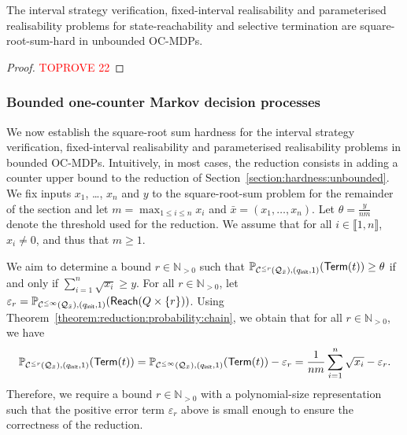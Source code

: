 \documentclass[a4paper,UKenglish,cleveref,autoref,thm-restate,colorlinks]{lipics-v2021}
\newcommand{\init}{\mathsf{init}}
\newcommand{\integerInterval}[1]{\llbracket{}#1\rrbracket{}}
\newcommand{\sqsx}{x} \newcommand{\sqsxVect}{\bar{x}} \newcommand{\sqsm}{m} \newcommand{\sqsy}{y} \newcommand{\sqsi}{i} \newcommand{\sqsn}{n} \newcommand{\sqsSize}{E}
\newcommand{\IN}{\mathbb{N}}
\newcommand{\INpos}{\IN_{>0}}
\newcommand{\ocmdp}{\mathcal{Q}}
\newcommand{\ocStateSpace}{Q}
\newcommand{\ocState}{q}
\newcommand{\ocStateC}{t}
\newcommand{\counterUB}{r}
\newcommand{\mchain}{\mathcal{C}}
\newcommand{\ocChainFin}[2]{\mchain^{\leq #2}(#1)}
\newcommand{\chainX}{\ocmdp_{\sqsxVect}}
\newcommand{\eleError}[1]{\varepsilon_{#1}}
\newcommand{\reach}[1]{\mathsf{Reach}(#1)}
\newcommand{\termination}{\mathsf{Term}}
\newcommand{\selectiveTermination}[1]{\termination({#1})}
\newcommand{\thresProba}{\theta}
\begin{document}
\begin{theorem}\label{verification:hardness:unbounded}
  The interval strategy verification, fixed-interval realisability and parameterised realisability problems for state-reachability and selective termination are square-root-sum-hard in unbounded OC-MDPs.
\end{theorem}
\begin{proof}\textcolor{red}{TOPROVE 22}\end{proof}

\subsubsection{Bounded one-counter Markov decision processes}\label{section:hardness:bounded}

We now establish the square-root sum hardness for the interval strategy verification, fixed-interval realisability and parameterised realisability problems  in bounded OC-MDPs.
Intuitively, in most cases, the reduction consists in adding a counter upper bound to the reduction of Section~\ref{section:hardness:unbounded}.
We fix inputs $\sqsx_1$, \ldots, $\sqsx_\sqsn$ and $\sqsy$ to the square-root-sum problem for the remainder of the section and let $\sqsm = \max_{1\leq\sqsi\leq\sqsn}\sqsx_\sqsi$ and $\sqsxVect = (\sqsx_1,\ldots, \sqsx_\sqsn)$.
Let $\thresProba = \frac{\sqsy}{\sqsn\sqsm}$ denote the threshold used for the reduction.
We assume that for all $\sqsi\in\integerInterval{1, \sqsn}$, $\sqsx_\sqsi\neq 0$, and thus that $\sqsm\geq1$.

We aim to determine a bound $\counterUB\in\INpos$ such that $\probaMCverb{\ocChainFin{\chainX}{\counterUB}}{(\ocState_\init, 1)}(\selectiveTermination{\ocStateC})\geq\thresProba$ if and only if $\sum_{\sqsi=1}^\sqsn\sqrt{\sqsx_\sqsi}\geq\sqsy$.
For all $\counterUB\in\INpos$, let $\eleError{\counterUB} = \probaMCverb{\ocChainFin{\chainX}{\infty}}{(\ocState_\init, 1)}(\reach{\ocStateSpace\times\{\counterUB\}})$.
Using Theorem~\ref{theorem:reduction:probability:chain}, we obtain that for all $\counterUB\in\INpos$, we have
\begin{equation*}
  \probaMCverb{\ocChainFin{\chainX}{\counterUB}}{(\ocState_\init, 1)}(\selectiveTermination{\ocStateC})
  = \probaMCverb{\ocChainFin{\chainX}{\infty}}{(\ocState_\init, 1)}(\selectiveTermination{\ocStateC})
  - \eleError{\counterUB}
  = \frac{1}{\sqsn\sqsm}\sum_{\sqsi=1}^\sqsn\sqrt{\sqsx_\sqsi}
  -\eleError{\counterUB}.
\end{equation*}
Therefore, we require a bound $\counterUB\in\INpos$ with a polynomial-size representation such that the positive error term $\eleError{\counterUB}$ above is small enough to ensure the correctness of the reduction.
\end{document}
